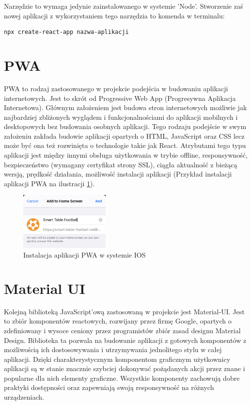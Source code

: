 Narzędzie to wymaga jedynie zainstalowanego w systemie 'Node'. Stworzenie zaś nowej aplikacji z wykorzystaniem tego narzędzia to komenda w terminalu:

\begin{lstlisting}[breaklines=true]
    npx create-react-app nazwa-aplikacji
\end{lstlisting}

\label{ch:frontend:pwa}
\section{PWA}
PWA to rodzaj zastosowanego w projekcie podejścia w budowaniu aplikacji internetowych. Jest to skrót od Progressive Web App (Progresywna Aplikacja Internetowa). Głównym założeniem jest budowa stron internetowych możliwie jak najbardziej zbliżonych wyglądem i funkcjonalnościami do aplikacji mobilnych i desktopowych bez budowania osobnych aplikacji. Tego rodzaju podejście w swym założeniu zakłada budowie aplikacji opartych o HTML, JavaScript oraz CSS lecz może być ona też rozwinięta o technologie takie jak React. Atrybutami tego typu aplikacji jest między innymi obsługa użytkowania w trybie offline, responsywność, bezpieczeństwo (wymagany certyfikat strony SSL), ciągła aktualność z bieżącą wersją, prędkość działania, możliwość instalacji aplikacji (Przykład instalacji aplikacji PWA na ilustracji \ref{fig:pwa-installation}).

\begin{figure}[h!]
    \centering
    \includegraphics[width=0.4\textwidth]{images/player/PWA_install.jpg}
    \caption{Instalacja aplikacji PWA w systemie IOS}
    \label{fig:pwa-installation}
\end{figure}

\label{section:material-ui}
\section{Material UI}
Kolejną biblioteką JavaScript'ową zastosowaną w projekcie jest Material-UI. Jest to zbiór komponentów reactowych, rozwijany przez firmę Google, opartych o zdefiniowany i wysoce ceniony przez programistów zbiór zasad designu Material Design. Biblioteka ta pozwala na budowanie aplikacji z gotowych komponentów z możliwością ich dostosowywania i utrzymywania jednolitego stylu w całej aplikacji. Dzięki charakterystycznym komponentom graficznym użytkownicy aplikacji są w stanie znacznie szybciej dokonywać pożądanych akcji przez znane i popularne dla nich elementy graficzne. Wszystkie komponenty zachowują dobre praktyki dostępności oraz zapewniają swoją responsywność na różnych urządzeniach.

